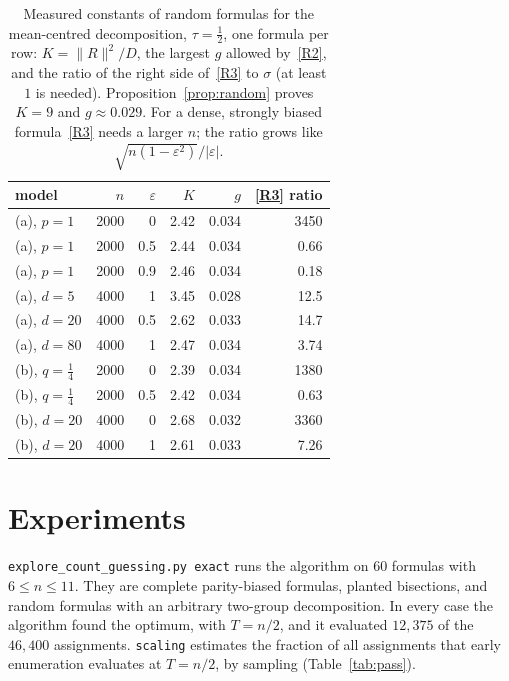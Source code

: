 \documentclass[11pt,a4paper]{article}
\theoremstyle{definition}
\theoremstyle{remark}
\begin{document}
\begin{table}[ht]
\centering
\begin{tabular}{lrrrrr}
\toprule
model & $n$ & $\varepsilon$ & $K$ & $g$ & \eqref{R3} ratio\\
\midrule
(a), $p=1$ & 2000 & 0 & 2.42 & 0.034 & 3450\\
(a), $p=1$ & 2000 & 0.5 & 2.44 & 0.034 & 0.66\\
(a), $p=1$ & 2000 & 0.9 & 2.46 & 0.034 & 0.18\\
(a), $d=5$ & 4000 & 1 & 3.45 & 0.028 & 12.5\\
(a), $d=20$ & 4000 & 0.5 & 2.62 & 0.033 & 14.7\\
(a), $d=80$ & 4000 & 1 & 2.47 & 0.034 & 3.74\\
(b), $q=\frac14$ & 2000 & 0 & 2.39 & 0.034 & 1380\\
(b), $q=\frac14$ & 2000 & 0.5 & 2.42 & 0.034 & 0.63\\
(b), $d=20$ & 4000 & 0 & 2.68 & 0.032 & 3360\\
(b), $d=20$ & 4000 & 1 & 2.61 & 0.033 & 7.26\\
\bottomrule
\end{tabular}
\caption{Measured constants of random formulas for the mean-centred
decomposition, $\tau=\frac12$, one formula per row: $K=\|R\|^2/D$, the largest
$g$ allowed by~\eqref{R2}, and the ratio of the right side of~\eqref{R3} to
$\sigma$ (at least $1$ is needed). Proposition~\ref{prop:random} proves $K=9$
and $g\approx0.029$. For a dense, strongly biased formula~\eqref{R3} needs a
larger $n$; the ratio grows like $\sqrt{n(1-\varepsilon^2)}/|\varepsilon|$.}
\label{tab:membership}
\end{table}

\section{Experiments}\label{sec:experiments}

\texttt{explore\_count\_guessing.py exact} runs the algorithm on 60 formulas
with $6\le n\le11$. They are complete parity-biased formulas, planted
bisections, and random formulas with an arbitrary two-group decomposition. In
every case the algorithm found the optimum, with $T=n/2$, and it evaluated
$12{,}375$ of the $46{,}400$ assignments. \texttt{scaling} estimates the
fraction of all assignments that early enumeration evaluates at $T=n/2$, by
sampling (Table~\ref{tab:pass}).
\end{document}
